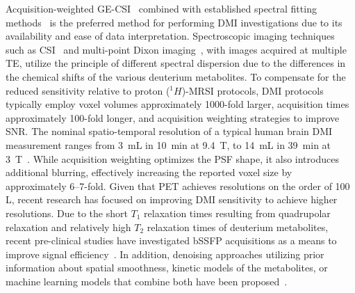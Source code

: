 Acquisition-weighted \gls{GE}-\gls{CSI}~\cite{brownNMRChemicalShift1982} combined with established spectral fitting methods~\cite{reederIterativeDecompositionWater2005,vanhammeImprovedMethodAccurate1997,purvisOXSAOpensourceMagnetic2017} is the preferred method for performing \gls{DMI} investigations due to its availability and ease of data interpretation. Spectroscopic imaging techniques such as \gls{CSI}~\cite{brownNMRChemicalShift1982} and multi-point Dixon imaging~\cite{dixonSimpleProtonSpectroscopic1984,gloverMultipointDixonTechnique1991}, with images acquired at multiple \gls{TE}, utilize the principle of different spectral dispersion due to the differences in the chemical shifts of the various deuterium metabolites. To compensate for the reduced sensitivity relative to proton ($^1H$)-\gls{MRSI} protocols, \gls{DMI} protocols typically employ voxel volumes approximately 1000-fold larger, acquisition times approximately 100-fold longer, and acquisition weighting strategies to improve \gls{SNR}. The nominal spatio-temporal resolution of a typical human brain \gls{DMI} measurement ranges from 3~mL in 10~min at 9.4~T, to 14~mL in 39~min at 3~T~\cite{ruhmDeuteriumMetabolicImaging2021, defeyterDeuteriumMetabolicImaging2018, seresroigDeuteriumMetabolicImaging2023, niessWholebrainDeuteriumMetabolic2024, adamsonDeuteriumMetabolicImaging2024}. While acquisition weighting optimizes the \gls{PSF} shape, it also introduces additional blurring, effectively increasing the reported voxel size by approximately 6–7-fold. Given that \gls{PET} achieves resolutions on the order of 100 \text{$\mu$}L, recent research has focused on improving \gls{DMI} sensitivity to achieve higher resolutions. Due to the short $T_1$ relaxation times resulting from quadrupolar relaxation and relatively high $T_2$ relaxation times of deuterium metabolites, recent pre-clinical studies  have investigated \gls{bSSFP} acquisitions as a means to improve signal efficiency~\cite{petersImprovingDeuteriumMetabolic2021,montraziHighsensitivityDeuteriumMetabolic2023}. In addition, denoising approaches utilizing prior information about spatial smoothness, kinetic models of the metabolites, or machine learning models that combine both have been proposed~\cite{montraziDeuteriumImagingWarburg2023,osburgPhysicsInformedDeepAutoencoder2025}.



